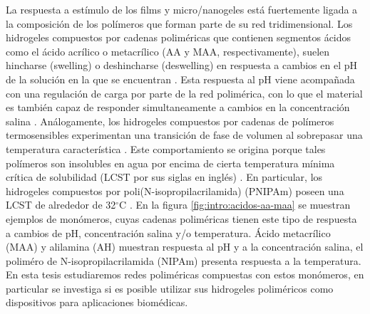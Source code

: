 La respuesta a est\'imulo de los films y micro/nanogeles est\'a fuertemente ligada a la composici\'on de los pol\'imeros que forman parte de su red tridimensional.
Los hidrogeles compuestos por cadenas polim\'ericas que contienen segmentos \'acidos como el \'acido acr\'ilico o metacr\'ilico (AA y MAA, respectivamente), suelen hincharse (swelling) o deshincharse (deswelling) en respuesta a cambios en el pH de la soluci\'on en la que se encuentran \cite{snowden1996colloidal}.
Esta respuesta al pH viene acompa\~nada con una regulaci\'on de carga por parte de la red polim\'erica, con lo que el material es tambi\'en capaz de responder simultaneamente a cambios en la concentraci\'on salina \cite{longo2019protonation}.
An\'alogamente, los hidrogeles compuestos por cadenas de pol\'imeros termosensibles experimentan una transici\'on de fase de volumen al sobrepasar una temperatura caracter\'istica \cite{Pelton1986,Pelton2000}.
Este comportamiento se origina porque tales pol\'imeros son insolubles en agua por encima de cierta temperatura m\'inima cr\'itica de solubilidad (LCST por sus siglas en ingl\'es) \cite{Kawaguchi2020}.
En particular, los hidrogeles compuestos por poli(N-isopropilacrilamida) (PNIPAm) poseen una LCST de alrededor de 32$^\circ$C \cite{Schild1992}.
En la figura \ref{fig:intro:acidos-aa-maa} se muestran ejemplos de mon\'omeros, cuyas cadenas polim\'ericas tienen este tipo de respuesta a cambios de  pH, concentraci\'on salina y/o temperatura. \'Acido metacr\'ilico (MAA) y  alilamina (AH) muestran respuesta al pH y a la concentraci\'on salina, el polim\'ero de  N-isopropilacrilamida (NIPAm)  presenta respuesta a la temperatura.
En esta tesis estudiaremos redes polim\'ericas compuestas con estos mon\'omeros, en particular se investiga si es posible utilizar sus hidrogeles polim\'ericos como dispositivos para aplicaciones biom\'edicas.  


